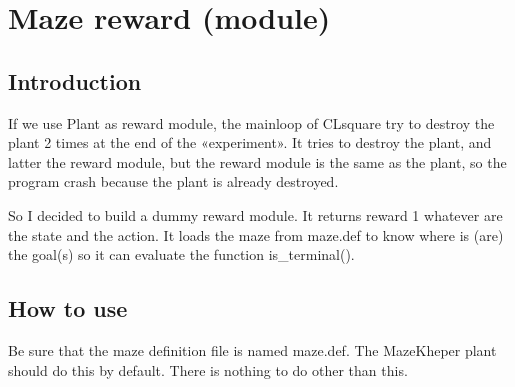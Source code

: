 \section{Maze reward (module)}

\subsection{Introduction}

If we use Plant as reward module, the mainloop of CLsquare try to destroy 
the plant 2 times at the end of the «experiment». It tries to destroy 
the plant, and latter the reward module, but the reward module is the 
same as the plant, so the program crash because the plant is already 
destroyed. 

So I decided to build a dummy reward module. It returns reward 1 
whatever are the state and the action. It loads the maze from maze.def 
to know where is (are) the goal(s) so it can evaluate the function 
is\_terminal().

\subsection{How to use}

Be sure that the maze definition file is named maze.def. The MazeKheper 
plant should do this by default. There is nothing to do other than this.

